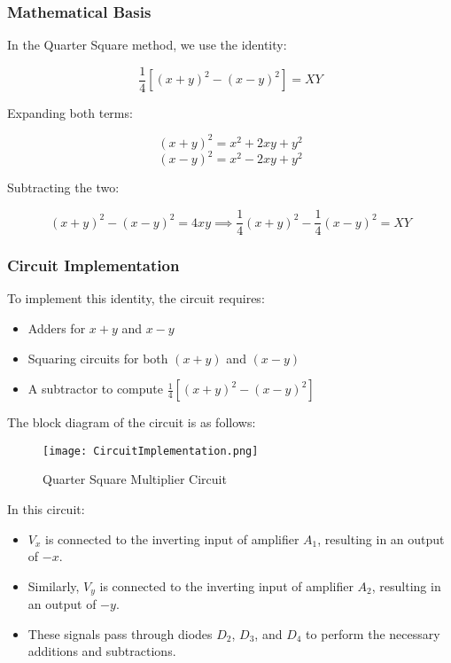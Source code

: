 \documentclass[a4paper,9pt,twoside,openany,twocolumn]{memoir}
\begin{document}
\subsubsection{Mathematical Basis}

In the Quarter Square method, we use the identity:

\[
\frac{1}{4}[(x + y)^2 - (x - y)^2] = XY
\]

Expanding both terms:

\[
(x + y)^2 = x^2 + 2xy + y^2
\]
\[
(x - y)^2 = x^2 - 2xy + y^2
\]

Subtracting the two:

\[
(x + y)^2 - (x - y)^2 = 4xy \implies \frac{1}{4}(x + y)^2 - \frac{1}{4}(x - y)^2 = XY
\]

\subsubsection{Circuit Implementation}

To implement this identity, the circuit requires:

\begin{itemize}
    \item Adders for \( x + y \) and \( x - y \)
    \item Squaring circuits for both \( (x + y) \) and \( (x - y) \)
    \item A subtractor to compute \( \frac{1}{4}[(x + y)^2 - (x - y)^2] \)
\end{itemize}

The block diagram of the circuit is as follows:

\begin{figure}[h]
    \centering
    \texttt{[image: CircuitImplementation.png]}
    \caption{Quarter Square Multiplier Circuit}
    \label{fig:quarter_square}
\end{figure}

In this circuit:

\begin{itemize}
    \item \( V_x \) is connected to the inverting input of amplifier \( A_1 \), resulting in an output of \( -x \).
    \item Similarly, \( V_y \) is connected to the inverting input of amplifier \( A_2 \), resulting in an output of \( -y \).
    \item These signals pass through diodes \( D_2 \), \( D_3 \), and \( D_4 \) to perform the necessary additions and subtractions.
\end{itemize}
\end{document}

